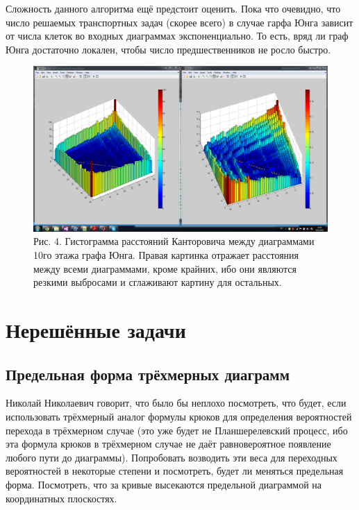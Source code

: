 \documentclass[12pt]{report}
\begin{document}
Сложность данного алгоритма ещё предстоит оценить. Пока что очевидно, что число решаемых транспортных задач (скорее всего) в случае гарфа Юнга зависит от числа клеток во входных диаграммах экспоненциально. То есть, вряд ли граф Юнга достаточно локален, чтобы число предшественников не росло быстро. 

\begin{figure}[!ht]
\begin{center}
\includegraphics[scale=0.3]{metric}
\\Рис. 4. Гистограмма расстояний Канторовича между диаграммами 10го этажа графа Юнга. Правая картинка отражает расстояния между всеми диаграммами, кроме крайних, ибо они являются резкими выбросами и сглаживают картину для остальных.
\end{center}
\end{figure}

\section* {Нерешённые задачи}

\subsection*{Предельная форма трёхмерных диаграмм}
\hspace{\parindent} Николай Николаевич говорит, что было бы неплохо посмотреть, что будет, если использовать трёхмерный аналог формулы крюков для определения вероятностей перехода в трёхмерном случае (это уже будет не Планшерелевский процесс, ибо эта формула крюков в трёхмерном случае не даёт равновероятное появление любого пути до диаграммы). Попробовать возводить эти веса для переходных вероятностей в некоторые степени и посмотреть, будет ли меняться предельная форма. Посмотреть, что за кривые высекаются предельной диаграммой на координатных плоскостях.
\end{document}
